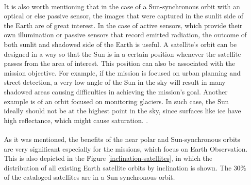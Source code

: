 \begin{itemize}
\begin{itemize}
	\\
	It is also worth mentioning that in the case of a Sun-synchronous orbit with an optical or else passive sensor, the images that were captured in the sunlit side of the Earth are of great interest. In the case of active sensors, which provide their own illumination or passive sensors that record emitted radiation, the outcome of both sunlit and shadowed side of the Earth is useful.	A satellite's orbit can be designed in a way so that the Sun is in a certain position whenever the satellite passes from the area of interest. This position can also be associated with the mission objective. For example, if the mission is focused on urban planning and street detection, a very low angle of the Sun in the sky will result in many shadowed areas causing difficulties in achieving the mission's goal. Another example is of an orbit focused on monitoring glaciers. In such case, the Sun ideally should not be at the highest point in the sky, since surfaces like ice have high reflectance, which might cause saturation. 
	 \cite{Campbell}.\\
	\\
	As it was mentioned, the benefits of the near polar and Sun-synchronous orbits are very significant especially for the missions, which focus on Earth Observation. This is also depicted in the Figure \ref{inclination-satellites}, in which the distribution of all existing Earth satellite orbits by inclination is shown. The 30\% of the cataloged satellites are in a Sun-synchronous orbit.
	\end{itemize}
\end{itemize}

